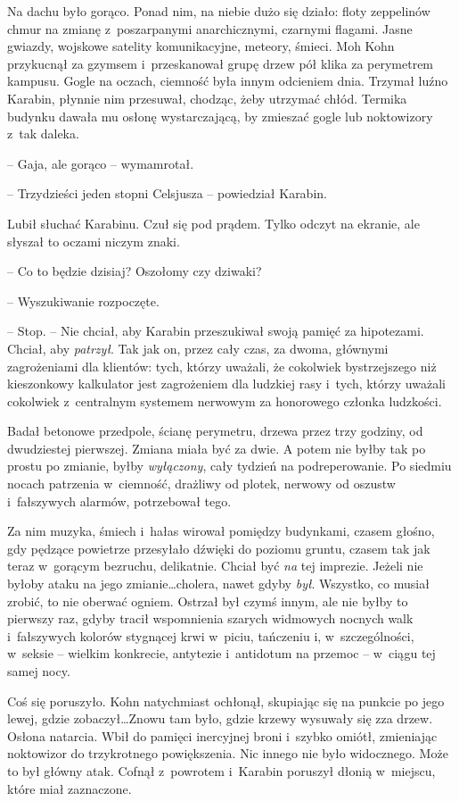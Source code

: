\documentclass[oneside,polish,11pt,sfheadings]{mwbk}
\begin{document}
Na dachu było gorąco. Ponad nim, na niebie dużo się działo: floty
zeppelinów chmur na zmianę z~poszarpanymi anarchicznymi, czarnymi
flagami. Jasne gwiazdy, wojskowe satelity komunikacyjne, meteory,
śmieci. Moh Kohn przykucnął za gzymsem i~przeskanował grupę drzew pół
klika za perymetrem kampusu. Gogle na oczach, ciemność była innym
odcieniem dnia. Trzymał luźno Karabin, płynnie nim przesuwał, chodząc,
żeby utrzymać chłód. Termika budynku dawała mu osłonę wystarczającą, by
zmieszać gogle lub noktowizory z~tak daleka.

-- Gaja, ale gorąco -- wymamrotał.

-- Trzydzieści jeden stopni Celsjusza -- powiedział Karabin.

Lubił słuchać Karabinu. Czuł się pod prądem. Tylko odczyt na ekranie,
ale słyszał to oczami niczym znaki.

-- Co to będzie dzisiaj? Oszołomy czy dziwaki?

-- Wyszukiwanie rozpoczęte.

-- Stop. -- Nie chciał, aby Karabin przeszukiwał swoją pamięć za
hipotezami. Chciał, aby \emph{patrzył}. Tak jak on, przez cały czas, za
dwoma, głównymi zagrożeniami dla klientów: tych, którzy uważali, że
cokolwiek bystrzejszego niż kieszonkowy kalkulator jest zagrożeniem dla
ludzkiej rasy i~tych, którzy uważali cokolwiek z~centralnym systemem
nerwowym za honorowego członka ludzkości.

Badał betonowe przedpole, ścianę perymetru, drzewa przez trzy godziny,
od dwudziestej pierwszej. Zmiana miała być za dwie. A potem nie byłby
tak po prostu po zmianie, byłby \emph{wyłączony}, cały tydzień na
podreperowanie. Po siedmiu nocach patrzenia w~ciemność, drażliwy od
plotek, nerwowy od oszustw i~fałszywych alarmów, potrzebował tego.

Za nim muzyka, śmiech i~hałas wirował pomiędzy budynkami, czasem głośno,
gdy pędzące powietrze przesyłało dźwięki do poziomu gruntu, czasem tak
jak teraz w~gorącym bezruchu, delikatnie. Chciał być \emph{na} tej
imprezie. Jeżeli nie byłoby ataku na jego zmianie\ldots cholera, nawet
gdyby \emph{był}. Wszyst\-ko, co musiał zrobić, to nie oberwać ogniem.
Ostrzał był czymś innym, ale nie byłby to pierwszy raz, gdyby tracił
wspomnienia szarych widmowych nocnych walk i~fałszywych kolorów
stygnącej krwi w~piciu, tańczeniu i, w~szczególności, w~seksie -- wielkim
konkrecie, antytezie i~antidotum na przemoc -- w~ciągu tej samej nocy.

Coś się poruszyło. Kohn natychmiast ochłonął, skupiając się na punkcie
po jego lewej, gdzie zobaczył\ldots Znowu tam było, gdzie krzewy wysuwały
się zza drzew. Osłona natarcia. Wbił do pamięci inercyjnej broni i~szybko omiótł, zmieniając noktowizor do trzykrotnego powiększenia. Nic
innego nie było widocznego. Może to był główny atak. Cofnął z~powrotem i~Karabin poruszył dłonią w~miejscu, które miał zaznaczone.
\end{document}
